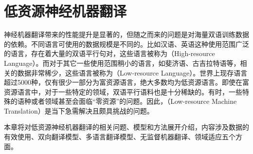 
%


\renewcommand\figurename{图}%
\renewcommand\tablename{表}%

\chapter{低资源神经机器翻译}

\parinterval 神经机器翻译带来的性能提升是显著的，但随之而来的问题是对海量双语训练数据的依赖。不同语言可使用的数据规模是不同的。比如汉语、英语这种使用范围广泛的语言，存在着大量的双语平行句对，这些语言被称为{\small{}}（High-resource Language）。而对于其它一些使用范围稍小的语言，如斐济语、古吉拉特语等，相关的数据非常稀少，这些语言被称为{\small{}}（Low-resource Language）。世界上现存语言超过5000种，仅有很少一部分为富资源语言，绝大多数均为低资源语言。即使在富资源语言中，对于一些特定的领域，双语平行语料也是十分稀缺的。有时，一些特殊的语种或者领域甚至会面临“零资源”的问题。因此，{\small{}}（Low-resource Machine Translation）是当下急需解决且颇具挑战的问题。

\parinterval 本章将对低资源神经机器翻译的相关问题、模型和方法展开介绍，内容涉及数据的有效使用、双向翻译模型、多语言翻译模型、无监督机器翻译、领域适应五个方面。


